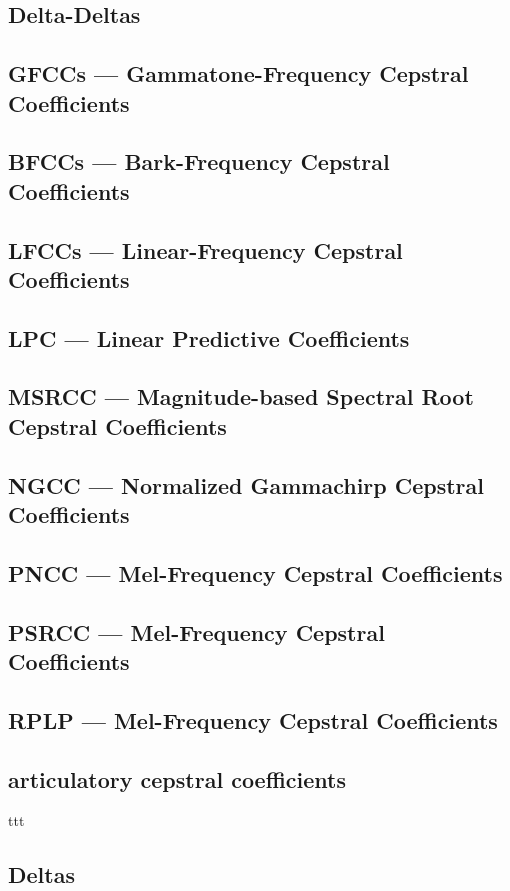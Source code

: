 \subsection{Delta-Deltas}

\subsection{GFCCs --- Gammatone-Frequency Cepstral Coefficients}
\subsection{BFCCs --- Bark-Frequency Cepstral Coefficients}
\subsection{LFCCs --- Linear-Frequency Cepstral Coefficients}
\subsection{LPC --- Linear Predictive Coefficients}
\subsection{MSRCC --- Magnitude-based Spectral Root Cepstral Coefficients}
\subsection{NGCC --- Normalized Gammachirp Cepstral Coefficients}
\subsection{PNCC --- Mel-Frequency Cepstral Coefficients}
\subsection{PSRCC --- Mel-Frequency Cepstral Coefficients}
\subsection{RPLP --- Mel-Frequency Cepstral Coefficients}
\subsection{articulatory cepstral coefficients}
ttt

\subsection{Deltas}
